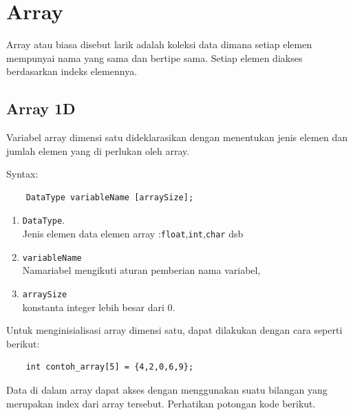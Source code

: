 \section{Array}
Array atau biasa disebut larik adalah koleksi data dimana setiap elemen mempunyai nama yang sama dan bertipe sama. Setiap elemen diakses berdasarkan  indeks elemennya.
\subsection{Array 1D}
Variabel array dimensi satu dideklarasikan dengan menentukan jenis elemen dan jumlah elemen yang di perlukan oleh array. 

Syntax:
\begin{verbatim}
    DataType variableName [arraySize];
\end{verbatim}
\begin{enumerate}
	\item \verb*|DataType|.\\
	Jenis elemen data elemen array :\verb*|float|,\verb*|int|,\verb*|char| dsb
	\item \verb*|variableName|\\
	Namariabel mengikuti aturan pemberian nama variabel,
	
	\item \verb*|arraySize| \\
	konstanta integer lebih besar dari 0. \\
\end{enumerate}

Untuk menginisialisasi array dimensi satu, dapat dilakukan dengan cara seperti berikut:
\begin{verbatim}
    int contoh_array[5] = {4,2,0,6,9};
\end{verbatim}

Data di dalam array dapat akses dengan menggunakan suatu bilangan yang merupakan index dari array tersebut. Perhatikan potongan kode berikut.

